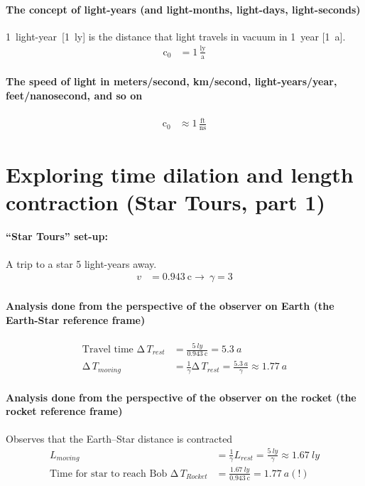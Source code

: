 \documentclass[pagesize,headsepline,10pt,parskip=half]{scrreprt}
\newcommand*\mdelta[1]{\ensuremath{\mathrm{\Delta\,}#1}}
\newcommand{\const}[1]{\ensuremath{\mathrm{#1}}}
\renewcommand{\c}{\const{c}}
\begin{document}
      \paragraph{The concept of light-years (and light-months, light-days, light-seconds)}
        1~light-year~[\SI{1}{ly}] is the distance that light travels in vacuum
        in 1~year [\SI{1}{a}].
        \begin{align*}
          \c_0 &= 1\,\frac{\text{ly}}{\text{a}}
        \end{align*}
      \paragraph{The speed of light in meters/second, km/second, light-years/year, feet/nanosecond, and so on}
        \begin{align*}
          \c_0 &\approx 1\,\frac{\text{ft}}{\text{ns}}
        \end{align*}

    \section{Exploring time dilation and length contraction (Star Tours, part 1)}
      \paragraph{“Star Tours” set-up:} A trip to a star 5 light-years away.
        \begin{align*}
          v &= \SI{0.943}{\c} \rightarrow~\gamma = 3
        \end{align*}

      \paragraph{Analysis done from the perspective of the observer on Earth (the Earth-Star reference frame)}
        \begin{align*}
          \text{Travel time } \mdelta{T}_{rest} &= \frac{\SI{5}{ly}}{\SI{0.943}{\c}} = \SI{5.3}{a}\\
          \mdelta{T}_{moving} &= \frac{1}{\gamma} \mdelta{T}_{rest} = \frac{\SI{5.3}{a}}{\gamma} \approx \SI{1.77}{a}
        \end{align*}

      \paragraph{Analysis done from the perspective of the observer on the rocket (the rocket reference frame)}
        Observes that the Earth--Star distance is contracted
        \begin{align*}
          L_{moving} &= \frac{1}{\gamma} L_{rest} = \frac{\SI{5}{ly}}{\gamma} \approx \SI{1.67}{ly}\\
          \text{Time for star to reach Bob } \mdelta{T}_{Rocket} &= \frac{\SI{1.67}{ly}}{\SI{0.943}{\c}} = \SI{1.77}{a}(!)\\
        \end{align*}
\end{document}

